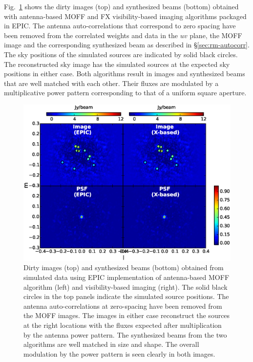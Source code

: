 \documentclass[a4paper,fleqn,usenatbib]{mnras}
\begin{document}
Fig.~\ref{fig:MOFF-FX-image} shows the dirty images (top) and synthesized beams
(bottom) obtained with antenna-based MOFF and FX visibility-based imaging 
algorithms packaged in EPIC. The antenna auto-correlations that correspond to 
zero spacing have been removed from the correlated weights and data in the 
$uv$ plane, the MOFF image and the corresponding synthesized beam as 
described in \S\ref{sec:rm-autocorr}. The sky positions of the simulated sources 
are indicated by solid black circles. The reconstructed sky image has the 
simulated sources at the expected sky positions in either case. Both algorithms 
result in images and synthesized beams that are well matched with each other. 
Their fluxes are modulated by a multiplicative power pattern corresponding to 
that of a uniform square aperture. 

\begin{figure}
  \includegraphics[width=\columnwidth]{figure6}
  \caption{Dirty images (top) and synthesized beams (bottom) obtained from 
    simulated data using EPIC implementation of antenna-based MOFF algorithm 
    (left) and visibility-based imaging (right). The solid black circles in the
    top panels indicate the simulated source positions. The antenna 
    auto-correlations at zero-spacing have been removed from the MOFF images. 
    The images in either case reconstruct the sources at the right locations 
    with the fluxes expected after multiplication by the antenna power pattern. 
    The synthesized beams from the two algorithms are well matched in size and
    shape. The overall modulation by the power pattern is seen clearly in both
    images.}
  \label{fig:MOFF-FX-image}
\end{figure}
\end{document}
